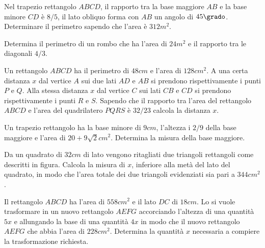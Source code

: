 \begin{multicols}{2}
\begin{esercizio}[\Ast]
 \label{ese:3.140}
Nel trapezio rettangolo $ ABCD $, il rapporto tra la base maggiore $ AB $ e la base
minore $ CD $ è $ 8/5 $, il lato obliquo forma con $ AB $ un angolo di $ 45\grado $. Determinare
il perimetro sapendo che l'area è $312\unit{m^2}$.
\end{esercizio}

\begin{esercizio}[\Ast]
 \label{ese:3.141}
Determina il perimetro di un rombo che ha l'area di $24\unit{m^2}$ e il rapporto tra
le diagonali $ 4/3 $.
\end{esercizio}

\begin{esercizio}[\Ast]
 \label{ese:3.142}
Un rettangolo $ ABCD $ ha il perimetro di $ 48\unit{cm} $ e l'area di $ 128\unit{cm^2} $. A una certa
distanza $x$ dal vertice $ A $ sui due lati $ AD $ e $ AB $ si prendono rispettivamente i
punti $ P $ e $ Q $. Alla stessa distanza $ x $ dal vertice $ C $ sui lati $ CB $ e $ CD $ si
prendono rispettivamente i punti $ R $ e $ S $. Sapendo che il rapporto tra l'area
del rettangolo $ ABCD $ e l'area del quadrilatero $ PQRS $ è $ 32/23 $ calcola la
distanza $x$.
\end{esercizio}

\begin{esercizio}
 \label{ese:3.143}
Un trapezio rettangolo ha la base minore di $ 9\unit{cm} $, l'altezza i $ 2/9 $ della base
maggiore e l'area di $20 + 9 \sqrt{2}\unit{cm^{2}}$. Determina la misura della base maggiore.
\end{esercizio}

\begin{esercizio}[\Ast]
 \label{ese:3.144}
Da un quadrato di $ 32\unit{cm} $ di lato vengono ritagliati due triangoli rettangoli
come descritti in figura. Calcola la misura di $ x $,
inferiore alla metà del lato del quadrato, in modo che l'area totale dei
due triangoli evidenziati sia pari a $ 344\unit{cm^2} $.
\begin{center}
 
\end{center}
\end{esercizio}

\begin{esercizio}[\Ast]
 \label{ese:3.145}
Il rettangolo $ ABCD $ ha l'area di $ 558\unit{cm^2} $ e il lato $ DC $ di $ 18\unit{cm} $. Lo si
vuole trasformare in un nuovo rettangolo $ AEFG $ accorciando l'altezza di una quantità $ 5x $ e allungando la base di
una quantità $ 4x $ in modo che il nuovo rettangolo $ AEFG $ che abbia l'area di
$ 228\unit{cm^2} $. Determina la quantità $ x $ necessaria a compiere la trasformazione
richiesta.
\end{esercizio}


\end{multicols}
